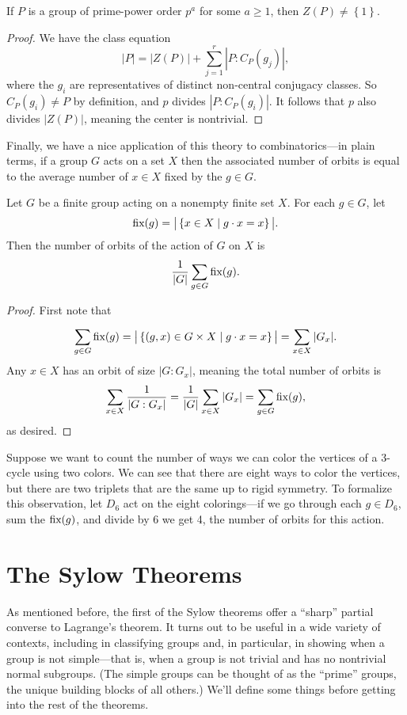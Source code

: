 \documentclass[../m171main.tex]{subfiles}
\begin{document}
\begin{theorem}[]
    If $P$ is a group of prime-power order $p^{a}$ for some $a \geq 1$, then $Z(P) \neq \left\{ 1 \right\}$.
\end{theorem}

\begin{proof}
    We have the class equation
    \[ |P| = |Z(P)| + \sum_{j=1}^{r} | P : C_P(g_j) |, \]
    where the $g_i$ are representatives of distinct non-central conjugacy classes.
    So $C_P(g_i) \neq P$ by definition, and $p$ divides $|P : C_P(g_i)|$.
    It follows that $p$ also divides $|Z(P)|$, meaning the center is nontrivial.
\end{proof}

Finally, we have a nice application of this theory to combinatorics---in plain terms, if a group $G$ acts on a set $X$ then the associated number of orbits is equal to the average number of $x \in X$ fixed by the $g \in G$.

\begin{theorem}   %
    Let $G$ be a finite group acting on a nonempty finite set $X$.
    For each $g \in G$, let
    \[ \textrm{fix}(g) = \big| \left\{ x \in X \mid g \cdot x = x \right\} \big|. \]
    Then the number of orbits of the action of $G$ on $X$ is
    \[ \frac{1}{|G|} \sum_{g \in G}^{} \textrm{fix}(g). \]
\end{theorem}

\begin{proof}
    First note that
    \[ \sum_{g \in G}^{} \textrm{fix}(g) = \big| \left\{ (g,x) \in G \times X \mid g \cdot x = x \right\} \big| = \sum_{x \in X}^{} |G_x|. \]
    Any $x \in X$ has an orbit of size $|G : G_x|$, meaning the total number of orbits is
    \[ \sum_{x \in X}^{} \frac{1}{|G : G_x|} = \frac{1}{|G|} \sum_{x \in X}^{} |G_x| = \sum_{g \in G}^{} \textrm{fix}(g), \]     %
    as desired.
\end{proof}

Suppose we want to count the number of ways we can color the vertices of a 3-cycle using two colors.
We can see that there are eight ways to color the vertices, but there are two triplets that are the same up to rigid symmetry.
To formalize this observation, let $D_6$ act on the eight colorings---if we go through each $g \in D_6$, sum the $\textrm{fix}(g)$, and divide by 6 we get 4, the number of orbits for this action.

\section{The Sylow Theorems}
As mentioned before, the first of the Sylow theorems offer a ``sharp'' partial converse to Lagrange's theorem.
It turns out to be useful in a wide variety of contexts, including in classifying groups and, in particular, in showing when a group is not simple---that is, when a group is not trivial and has no nontrivial normal subgroups.
(The simple groups can be thought of as the ``prime'' groups, the unique building blocks of all others.)
We'll define some things before getting into the rest of the theorems.
\end{document}
